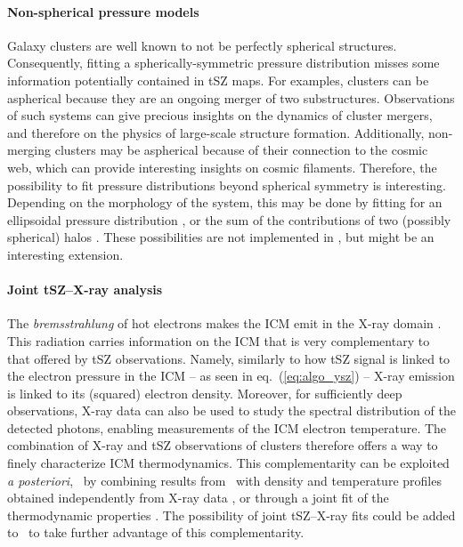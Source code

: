 \paragraph{Non-spherical pressure models} %
Galaxy clusters are well known to not be perfectly spherical structures.
Consequently, fitting a spherically-symmetric pressure distribution misses some information potentially contained in tSZ maps.
For examples, clusters can be aspherical because they are an ongoing merger of two substructures.
Observations of such systems can give precious insights on the dynamics of cluster mergers, and therefore on the physics of large-scale structure formation.
Additionally, non-merging clusters may be aspherical because of their connection to the cosmic web, which can provide interesting insights on cosmic filaments.
Therefore, the possibility to fit pressure distributions beyond spherical symmetry is interesting.
Depending on the morphology of the system, this may be done by fitting for an ellipsoidal pressure distribution \addcite, or the sum of the contributions of two (possibly spherical) halos \citep[\eg][]{artis_psz2_2022}.
These possibilities are not implemented in \panco, but might be an interesting extension.

\paragraph{Joint tSZ--X-ray analysis} %
The \textit{bremsstrahlung} of hot electrons makes the ICM emit in the X-ray domain \citep[see \eg][for reviews]{bohringer_x-ray_2010, bohringer_x-ray_2013}.
This radiation carries information on the ICM that is very complementary to that offered by tSZ observations.
Namely, similarly to how tSZ signal is linked to the electron pressure in the ICM -- as seen in eq.~(\ref{eq:algo_ysz}) -- X-ray emission is linked to its (squared) electron density.
Moreover, for sufficiently deep observations, X-ray data can also be used to study the spectral distribution of the detected photons, enabling measurements of the ICM electron temperature.
The combination of X-ray and tSZ observations of clusters therefore offers a way to finely characterize ICM thermodynamics.
This complementarity can be exploited \textit{a posteriori}, \eg\ by combining results from \panco\ with density and temperature profiles obtained independently from X-ray data \citep[\eg][]{keruzore_exploiting_2020}, or through a joint fit of the thermodynamic properties \citep[\eg][]{castagna_joxsz_2020-1}.
The possibility of joint tSZ--X-ray fits could be added to \panco\ to take further advantage of this complementarity.

